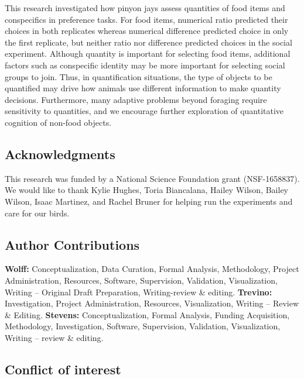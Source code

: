 \documentclass[
  ,pub,floatsintext]{apa6}
\begin{document}
This research investigated how pinyon jays assess quantities of food items and conspecifics in preference tasks. For food items, numerical ratio predicted their choices in both replicates whereas numerical difference predicted choice in only the first replicate, but neither ratio nor difference predicted choices in the social experiment. Although quantity is important for selecting food items, additional factors such as conspecific identity may be more important for selecting social groups to join. Thus, in quantification situations, the type of objects to be quantified may drive how animals use different information to make quantity decisions. Furthermore, many adaptive problems beyond foraging require sensitivity to quantities, and we encourage further exploration of quantitative cognition of non-food objects.

\hypertarget{acknowledgments}{%
\subsection{Acknowledgments}\label{acknowledgments}}

This research was funded by a National Science Foundation grant (NSF-1658837). We would like to thank Kylie Hughes, Toria Biancalana, Hailey Wilson, Bailey Wilson, Isaac Martinez, and Rachel Bruner for helping run the experiments and care for our birds.

\hypertarget{author-contributions}{%
\subsection{Author Contributions}\label{author-contributions}}

\textbf{Wolff:} Conceptualization, Data Curation, Formal Analysis, Methodology, Project Administration, Resources, Software, Supervision, Validation, Visualization, Writing -- Original Draft Preparation, Writing-review \& editing. \textbf{Trevino:} Investigation, Project Administration, Resources, Visualization, Writing -- Review \& Editing. \textbf{Stevens:} Conceptualization, Formal Analysis, Funding Acquisition, Methodology, Investigation, Software, Supervision, Validation, Visualization, Writing -- review \& editing.

\hypertarget{conflict-of-interest}{%
\subsection{Conflict of interest}\label{conflict-of-interest}}
\end{document}

